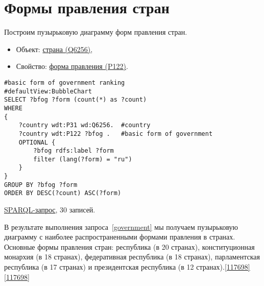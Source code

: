 \section{Формы правления стран}

Построим пузырьковую диаграмму форм правления стран.

\begin{itemize}
    \item Объект: \href{https://www.wikidata.org/wiki/Q6256}{страна (Q6256)},
    \item Свойство: \href{https://www.wikidata.org/wiki/Property:P122}{форма правления (P122)}.
\end{itemize}

\begin{lstlisting}[language=SPARQL language=SPARQL, label=government, caption=Пузырьковая диаграмма форм правления стран]
#basic form of government ranking
#defaultView:BubbleChart
SELECT ?bfog ?form (count(*) as ?count)
WHERE 
{
    ?country wdt:P31 wd:Q6256.  #country
    ?country wdt:P122 ?bfog .   #basic form of government
    OPTIONAL {
		?bfog rdfs:label ?form
		filter (lang(?form) = "ru")
	}
}
GROUP BY ?bfog ?form
ORDER BY DESC(?count) ASC(?form)
\end{lstlisting}

\href{https://query.wikidata.org/#%23basic%20form%20of%20government%20ranking%0A%23defaultView%3ABubbleChart%0ASELECT%20%3Fbfog%20%3Fform%20%28count%28%2a%29%20as%20%3Fcount%29%0AWHERE%20%0A%7B%0A%20%20%20%20%3Fcountry%20wdt%3AP31%20wd%3AQ6256.%0A%20%20%20%20%3Fcountry%20wdt%3AP122%20%3Fbfog%20.%0A%20%20%20%20OPTIONAL%20%7B%0A%09%09%3Fbfog%20rdfs%3Alabel%20%3Fform%0A%09%09filter%20%28lang%28%3Fform%29%20%3D%20%22ru%22%29%0A%09%7D%0A%7D%0AGROUP%20BY%20%3Fbfog%20%3Fform%0AORDER%20BY%20DESC%28%3Fcount%29%20ASC%28%3Fform%29}{SPARQL-запрос}, 30 записей.

В результате выполнения запроса~\ref{government} мы получаем пузырьковую диаграмму с наиболее распространенными формами правления в странах. 
Основные формы правления стран: республика (в 20 странах), конституционная монархия (в 18 странах), федеративная республика (в 18 странах), парламентская республика (в 17 странах) и президентская республика (в 12 странах).\ref{117698}\ref{117698}
